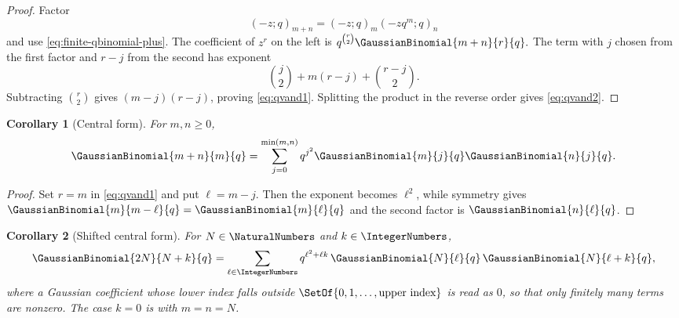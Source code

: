 \documentclass[11pt,a4paper,oneside,openany]{book}
\newtheorem{corollary}[corollary]{Corollary}
\theoremstyle{definition}
\theoremstyle{remark}
\begin{document}
\begin{proof}
Factor
\[
 (-z;q)_{m+n}=(-z;q)_m(-zq^m;q)_n
\]
and use \eqref{eq:finite-qbinomial-plus}.  The coefficient of $z^r$ on the left is
\(
 q^{\binom r2}\GaussianBinomial{m+n}{r}{q}.
\)
The term with $j$ chosen from the first factor and $r-j$ from the second has exponent
\[
 \binom j2+m(r-j)+\binom{r-j}{2}.
\]
Subtracting $\binom r2$ gives $(m-j)(r-j)$, proving \eqref{eq:qvand1}.  Splitting the product in the reverse order gives \eqref{eq:qvand2}.
\end{proof}

\begin{corollary}[Central form]\label{cor:central-vandermonde}
For $m,n\ge0$,
\[
 \GaussianBinomial{m+n}{m}{q}
 =\sum_{j=0}^{\min(m,n)}
 q^{j^2}\GaussianBinomial{m}{j}{q}\GaussianBinomial{n}{j}{q}.
\]
\end{corollary}

\begin{proof}
Set $r=m$ in \eqref{eq:qvand1} and put $\ell=m-j$.  Then the exponent becomes $\ell^2$, while symmetry gives $\GaussianBinomial{m}{m-\ell}{q}=\GaussianBinomial{m}{\ell}{q}$ and the second factor is $\GaussianBinomial{n}{\ell}{q}$.
\end{proof}


\begin{corollary}[Shifted central form]\label{cor:shifted-central-vandermonde}
For $N\in\NaturalNumbers$ and $k\in\IntegerNumbers$,
\begin{equation}
 \GaussianBinomial{2N}{N+k}{q}
 =\sum_{\ell\in\IntegerNumbers}q^{\ell^2+\ell k}\,
 \GaussianBinomial{N}{\ell}{q}\,\GaussianBinomial{N}{\ell+k}{q},
 \label{eq:shifted-central-vandermonde}
\end{equation}
where a Gaussian coefficient whose lower index falls outside $\SetOf{0,1,\dots,\text{upper index}}$ is read as $0$, so that only finitely many terms are nonzero.  The case $k=0$ is  with $m=n=N$.
\end{corollary}
\end{document}
